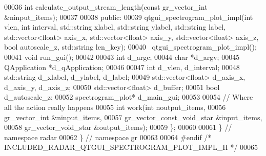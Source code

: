\begin{DoxyCode}
00036       \textcolor{keywordtype}{int} calculate_output_stream_length(\textcolor{keyword}{const} gr\_vector\_int &ninput\_items);
00037 
00038      \textcolor{keyword}{public}:
00039       qtgui_spectrogram_plot_impl(\textcolor{keywordtype}{int} vlen, \textcolor{keywordtype}{int} interval, std::string xlabel, 
      std::string ylabel, std::string label, std::vector<float> axis\_x, std::vector<float> axis\_y, 
      std::vector<float> axis\_z, \textcolor{keywordtype}{bool} autoscale\_z, std::string len\_key);
00040       ~qtgui_spectrogram_plot_impl();
00041       \textcolor{keywordtype}{void} run_gui();
00042       
00043       \textcolor{keywordtype}{int} d_argc;
00044       \textcolor{keywordtype}{char} *d_argv;
00045       QApplication *d_qApplication;
00046       
00047       \textcolor{keywordtype}{int} d_vlen, d_interval;
00048       std::string d_xlabel, d_ylabel, d_label;
00049       std::vector<float> d_axis_x, d_axis_y, d_axis_z;
00050       std::vector<float> d_buffer;
00051       \textcolor{keywordtype}{bool} d_autoscale_z;
00052       spectrogram_plot* d_main_gui;
00053 
00054       \textcolor{comment}{// Where all the action really happens}
00055       \textcolor{keywordtype}{int} work(\textcolor{keywordtype}{int} noutput\_items,
00056                gr\_vector\_int &ninput\_items,
00057                gr\_vector\_const\_void\_star &input\_items,
00058                gr\_vector\_void\_star &output\_items);
00059     \};
00060 
00061   \} \textcolor{comment}{// namespace radar}
00062 \} \textcolor{comment}{// namespace gr}
00063 
00064 \textcolor{preprocessor}{#endif }\textcolor{comment}{/* INCLUDED\_RADAR\_QTGUI\_SPECTROGRAM\_PLOT\_IMPL\_H */}\textcolor{preprocessor}{}
00065 
\end{DoxyCode}
